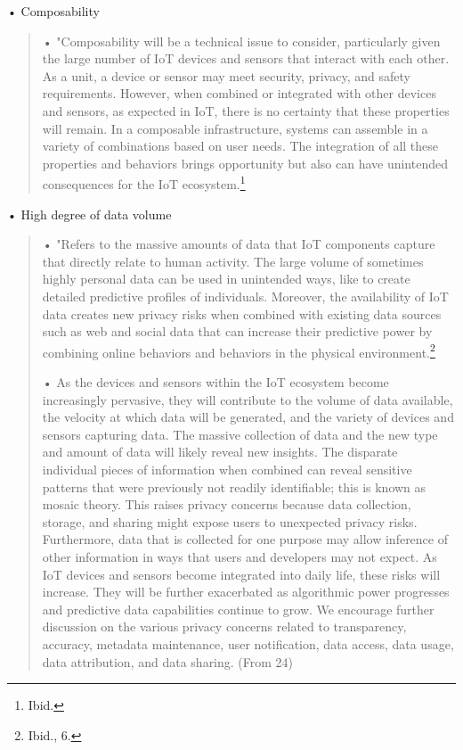 • Composability

\begin{quote}
• "Composability will be a technical issue to consider, particularly
given the large number of IoT devices and sensors that interact with
each other. As a unit, a device or sensor may meet security, privacy,
and safety requirements. However, when combined or integrated with other
devices and sensors, as expected in IoT, there is no certainty that
these properties will remain. In a composable infrastructure, systems
can assemble in a variety of combinations based on user needs. The
integration of all these properties and behaviors brings opportunity but
also can have unintended consequences for the IoT ecosystem.\footnote{Ibid.}
\end{quote}

• High degree of data volume

\begin{quote}
• "Refers to the massive amounts of data that IoT components capture
that directly relate to human activity. The large volume of sometimes
highly personal data can be used in unintended ways, like to create
detailed predictive profiles of individuals. Moreover, the availability
of IoT data creates new privacy risks when combined with existing data
sources such as web and social data that can increase their predictive
power by combining online behaviors and behaviors in the physical
environment.\footnote{Ibid., 6.}

• As the devices and sensors within the IoT ecosystem become
increasingly pervasive, they will contribute to the volume of data
available, the velocity at which data will be generated, and the variety
of devices and sensors capturing data. The massive collection of data
and the new type and amount of data will likely reveal new insights. The
disparate individual pieces of information when combined can reveal
sensitive patterns that were previously not readily identifiable; this
is known as mosaic theory. This raises privacy concerns because data
collection, storage, and sharing might expose users to unexpected
privacy risks. Furthermore, data that is collected for one purpose may
allow inference of other information in ways that users and developers
may not expect. As IoT devices and sensors become integrated into daily
life, these risks will increase. They will be further exacerbated as
algorithmic power progresses and predictive data capabilities continue
to grow. We encourage further discussion on the various privacy concerns
related to transparency, accuracy, metadata maintenance, user
notification, data access, data usage, data attribution, and data
sharing. (From 24)
\end{quote}